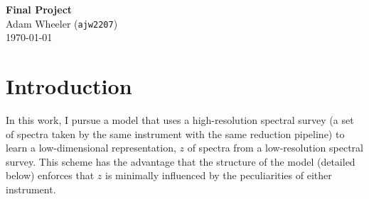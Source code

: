 \documentclass[12pt]{article}
\begin{document}
\begin{flushleft}
\textbf{Final Project} \\
Adam Wheeler (\texttt{ajw2207}) \\
\today
\end{flushleft}
\normalsize
%

\section{Introduction}
In this work, I pursue a model that uses a high-resolution spectral survey (a set of spectra taken by the same instrument with the same reduction pipeline) to learn a low-dimensional representation, $z$ of spectra from a low-resolution spectral survey.
This scheme has the advantage that the structure of the model (detailed below) enforces that $z$ is minimally influenced by the peculiarities of either instrument.
\end{document}
